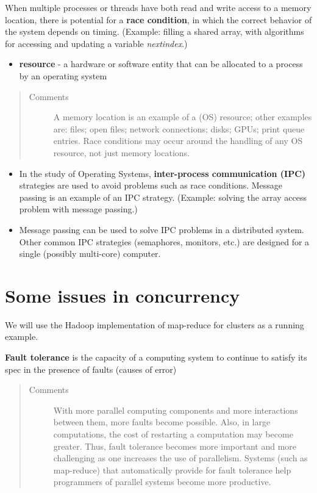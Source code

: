 \documentclass[letterpaper,10pt,english]{sphinxmanual}
\begin{document}
When multiple processes or threads have both read and write access to a memory location, there is potential for a \textbf{race condition}, in which the correct behavior of the system depends on timing. (Example: filling a shared array, with algorithms for accessing and updating a variable \emph{nextindex}.)
\begin{itemize}
\item {} 
\textbf{resource} - a hardware or software entity that can be allocated to a process by an operating system

\end{itemize}
\begin{quote}\begin{description}
\item[{Comments}] \leavevmode
A memory location is an example of a (OS) resource; other examples are: files; open files; network connections; disks; GPUs; print queue entries. Race conditions may occur around the handling of any OS resource, not just memory locations.

\end{description}\end{quote}
\begin{itemize}
\item {} 
In the study of Operating Systems, \textbf{inter-process communication (IPC)} strategies are used to avoid problems such as race conditions. Message passing is an example of an IPC strategy. (Example: solving the array access problem with message passing.)

\item {} 
Message passing can be used to solve IPC problems in a distributed system. Other common IPC strategies (semaphores, monitors, etc.) are designed for a single (possibly multi-core) computer.

\end{itemize}


\chapter{Some issues in concurrency}
\label{ConcurrentIssue/ConcurrentIssue:some-issues-in-concurrency}\label{ConcurrentIssue/ConcurrentIssue::doc}
We will use the Hadoop implementation of map-reduce for clusters as a running example.

\textbf{Fault tolerance} is the capacity of a computing system to continue to satisfy its spec in the presence of faults (causes of error)
\begin{quote}\begin{description}
\item[{Comments}] \leavevmode
With more parallel computing components and more interactions between them, more faults become possible. Also, in large computations, the cost of restarting a computation may become greater. Thus, fault tolerance becomes more important and more challenging as one increases the use of parallelism. Systems (such as map-reduce) that automatically provide for fault tolerance help programmers of parallel systems become more productive.

\end{description}\end{quote}
\end{document}
